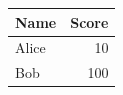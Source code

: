\begin{tabular}{lr}
  \toprule
  Name  & Score \\
  \midrule
  Alice &    10 \\
  Bob   &   100 \\
  \bottomrule
\end{tabular}
